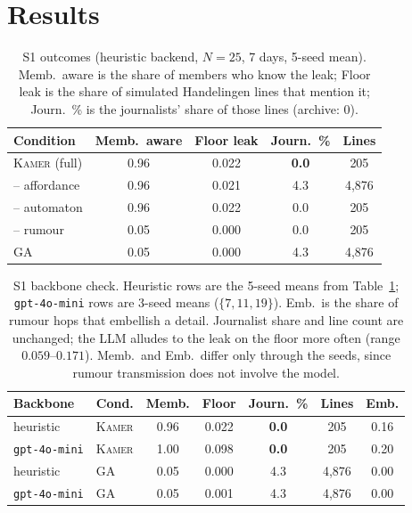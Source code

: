 \documentclass[sigconf,review,anonymous]{acmart}
\newcommand{\sys}{\textsc{Kamer}}
\begin{document}
\section{Results}
\label{sec:results}

\begin{table}[t]
\caption{S1 outcomes (heuristic backend, $N{=}25$, 7 days, 5-seed mean).
Memb.\ aware is the share of members who know the leak; Floor leak is the
share of simulated Handelingen lines that mention it; Journ.\ \% is the
journalists' share of those lines (archive: $0$).}
\label{tab:interview}
\centering\small
\setlength{\tabcolsep}{3.5pt}
\begin{tabular}{lcccc}
\toprule
Condition & Memb.\ aware & Floor leak & Journ.\ \% & Lines \\
\midrule
\sys{} (full) & 0.96 & 0.022 & \textbf{0.0} & 205 \\
\quad -- affordance & 0.96 & 0.021 & 4.3 & 4{,}876 \\
\quad -- automaton & 0.96 & 0.022 & 0.0 & 205 \\
\quad -- rumour & 0.05 & 0.000 & 0.0 & 205 \\
GA~\cite{park2023generative} & 0.05 & 0.000 & 4.3 & 4{,}876 \\
\bottomrule
\end{tabular}
\end{table}

\begin{table}[t]
\caption{S1 backbone check. Heuristic rows are the 5-seed means from
Table~\ref{tab:interview}; \texttt{gpt-4o-mini} rows are 3-seed means
($\{7,11,19\}$). Emb.\ is the share of rumour hops that embellish a detail.
Journalist share and line count are unchanged; the LLM alludes to the leak
on the floor more often (range $0.059$--$0.171$). Memb.\ and Emb.\ differ
only through the seeds, since rumour transmission does not involve the
model.}
\label{tab:backbone}
\centering\small
\setlength{\tabcolsep}{3.2pt}
\begin{tabular}{llccccc}
\toprule
Backbone & Cond. & Memb. & Floor & Journ.\ \% & Lines & Emb. \\
\midrule
heuristic & \sys{} & 0.96 & 0.022 & \textbf{0.0} & 205 & 0.16 \\
\texttt{gpt-4o-mini} & \sys{} & 1.00 & 0.098 & \textbf{0.0} & 205 & 0.20 \\
heuristic & GA & 0.05 & 0.000 & 4.3 & 4{,}876 & 0.00 \\
\texttt{gpt-4o-mini} & GA & 0.05 & 0.001 & 4.3 & 4{,}876 & 0.00 \\
\bottomrule
\end{tabular}
\end{table}
\end{document}
